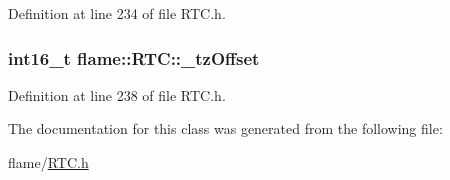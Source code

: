 Definition at line 234 of file R\-T\-C.\-h.

\hypertarget{classflame_1_1_r_t_c_a88b4f62e5114d3cf608a1c7029881d85}{
\subsubsection[{\-\_\-tz\-Offset}]{\setlength{\rightskip}{0pt plus 5cm}int16\-\_\-t flame\-::\-R\-T\-C\-::\-\_\-tz\-Offset\hspace{0.3cm}{\ttfamily [protected]}}}\label{classflame_1_1_r_t_c_a88b4f62e5114d3cf608a1c7029881d85}


Definition at line 238 of file R\-T\-C.\-h.



The documentation for this class was generated from the following file\-:\begin{DoxyCompactItemize}
\item 
flame/\hyperlink{_r_t_c_8h}{R\-T\-C.\-h}\end{DoxyCompactItemize}

